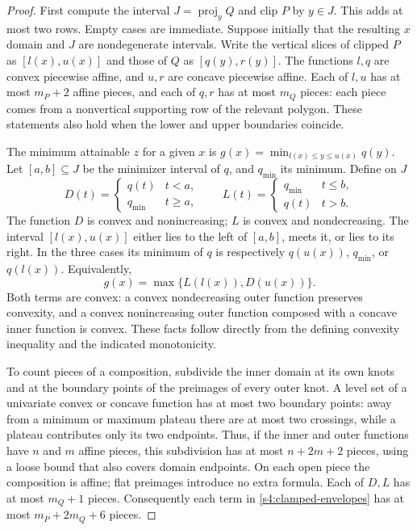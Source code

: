 \begin{proof}
First compute the interval $J=\operatorname{proj}_y Q$ and clip $P$
by $y\in J$. This adds at most two rows. Empty cases are immediate.
Suppose initially that the resulting $x$ domain and $J$ are
nondegenerate intervals. Write the vertical slices of clipped $P$ as
$[l(x),u(x)]$ and those of $Q$ as $[q(y),r(y)]$. The functions $l,q$
are convex piecewise affine, and $u,r$ are concave piecewise affine.
Each of $l,u$ has at most $m_P+2$ affine pieces, and each of $q,r$
has at most $m_Q$ pieces: each piece comes from a nonvertical
supporting row of the relevant polygon. These statements also hold
when the lower and upper boundaries coincide.

The minimum attainable $z$ for a given $x$ is
$g(x)=\min_{l(x)\le y\le u(x)}q(y)$. Let $[a,b]\subseteq J$ be the
minimizer interval of $q$, and $q_{\min}$ its minimum. Define on $J$
\[
 D(t)=\begin{cases}q(t)&t<a,\\q_{\min}&t\ge a,\end{cases}
 \qquad
 L(t)=\begin{cases}q_{\min}&t\le b,\\q(t)&t>b.\end{cases}
\]
The function $D$ is convex and nonincreasing; $L$ is convex and
nondecreasing. The interval $[l(x),u(x)]$ either lies to the left of
$[a,b]$, meets it, or lies to its right. In the three cases its
minimum of $q$ is respectively $q(u(x))$, $q_{\min}$, or $q(l(x))$.
Equivalently,
\begin{equation}
 g(x)=\max\{L(l(x)),D(u(x))\}.
 \label{s4:clamped-envelopes}
\end{equation}
Both terms are convex: a convex nondecreasing outer function preserves
convexity, and a convex nonincreasing outer function composed with a
concave inner function is convex. These facts follow directly from
the defining convexity inequality and the indicated monotonicity.

To count pieces of a composition, subdivide the inner domain at its
own knots and at the boundary points of the preimages of every outer
knot. A level set of a univariate convex or concave function has at
most two boundary points: away from a minimum or maximum plateau
there are at most two crossings, while a plateau contributes only
its two endpoints. Thus, if the inner and outer functions have $n$
and $m$ affine pieces, this subdivision has at most $n+2m+2$ pieces,
using a loose bound that also covers domain endpoints. On each open
piece the composition is affine; flat preimages introduce no extra
formula. Each of $D,L$ has at most $m_Q+1$ pieces. Consequently each
term in \eqref{s4:clamped-envelopes} has at most
$m_P+2m_Q+6$ pieces.


\end{proof}
